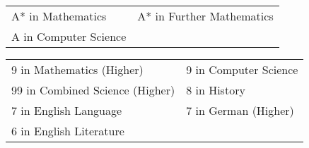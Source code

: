 \documentclass[a4paper, 12pt]{article}
\newlength{\spacebox}
\newcommand{\skill}[2]{
	\noindent\hangindent=2em\hangafter=0
	\parbox{3\spacebox}{
		\textbf{#1}}
	#2 \par}
\begin{document}
\begin{center}
\end{center}

\begin{center}
	\begin{tabular}{m{12em} m{12em}}
		A* in Mathematics & A* in Further Mathematics \\
		A in Computer Science
	\end{tabular}
\end{center}

\begin{center}
\end{center}

\begin{center}
	\begin{tabular}{m{16em} m{10em}}
		9 in Mathematics (Higher) & 9 in Computer Science \\
		99 in Combined Science (Higher) & 8 in History \\
		7 in English Language & 7 in German (Higher) \\
		6 in English Literature
	\end{tabular}
\end{center}

\end{document}
